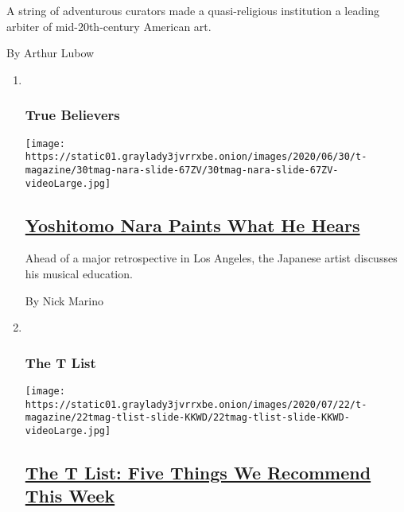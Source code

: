 \begin{enumerate}
\begin{enumerate}
    A string of adventurous curators made a quasi-religious institution
    a leading arbiter of mid-20th-century American art.

    By Arthur Lubow
  \end{enumerate}
\end{enumerate}

\begin{enumerate}
\def\labelenumi{\arabic{enumi}.}
\item ~
  \hypertarget{true-believers-4}{%
  \subsubsection{True Believers}\label{true-believers-4}}

  \texttt{[image: https://static01.graylady3jvrrxbe.onion/images/2020/06/30/t-magazine/30tmag-nara-slide-67ZV/30tmag-nara-slide-67ZV-videoLarge.jpg]}

  \hypertarget{yoshitomo-nara-paints-what-he-hears}{%
  \subsection{\texorpdfstring{\href{/2020/07/24/t-magazine/yoshitomo-nara.html}{Yoshitomo
  Nara Paints What He
  Hears}}{Yoshitomo Nara Paints What He Hears}}\label{yoshitomo-nara-paints-what-he-hears}}

  Ahead of a major retrospective in Los Angeles, the Japanese artist
  discusses his musical education.

  By Nick Marino
\item ~
  \hypertarget{the-t-list}{%
  \subsubsection{The T List}\label{the-t-list}}

  \texttt{[image: https://static01.graylady3jvrrxbe.onion/images/2020/07/22/t-magazine/22tmag-tlist-slide-KKWD/22tmag-tlist-slide-KKWD-videoLarge.jpg]}

  \hypertarget{the-t-list-five-things-we-recommend-this-week}{%
  \subsection{\texorpdfstring{\href{/2020/07/23/t-magazine/puzzles-bug-spray-tlist.html}{The
  T List: Five Things We Recommend This
  Week}}{The T List: Five Things We Recommend This Week}}\label{the-t-list-five-things-we-recommend-this-week}}


\end{enumerate}
